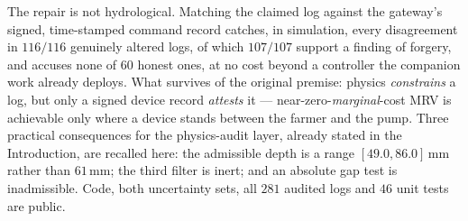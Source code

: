 The repair is not hydrological. Matching the claimed log against the gateway's
signed, time-stamped command record catches, in simulation, every disagreement
in $116/116$
genuinely altered logs, of which $107/107$ support a finding of forgery, and
accuses none of $60$ honest ones, at no cost beyond a controller the companion
work already deploys. What survives of the original premise: physics
\emph{constrains} a log, but only a signed device record \emph{attests} it
--- near-zero-\emph{marginal}-cost MRV is achievable only where a device stands
between the
farmer and the pump. Three practical consequences for the physics-audit layer, already stated in the Introduction, are recalled here: the admissible depth is a range $[49.0,86.0]$\,mm rather than $61$\,mm; the third filter is inert; and an absolute gap test is inadmissible. Code, both uncertainty sets, all $281$
audited logs and $46$ unit tests are public.

